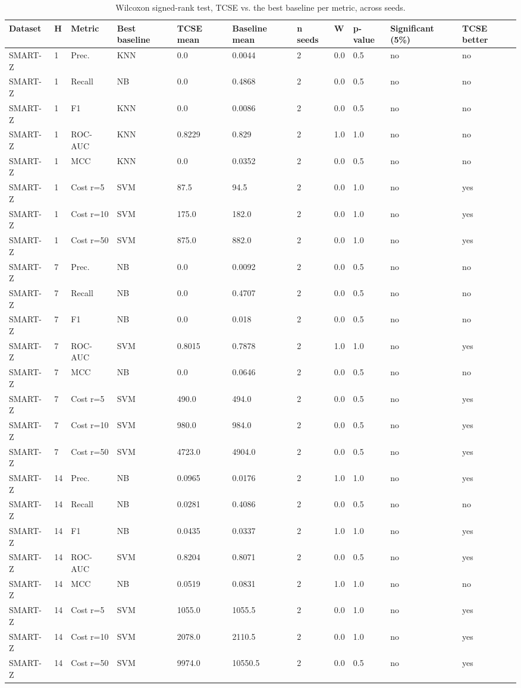 \begin{table}[t]
\centering
\caption{Wilcoxon signed-rank test, TCSE vs. the best baseline per metric, across seeds.}
\label{tab:table2_wilcoxon}
\footnotesize
\begin{tabular}{lllllllllll}
\toprule
Dataset & H & Metric & Best baseline & TCSE mean & Baseline mean & n seeds & W & p-value & Significant (5\%) & TCSE better \\
\midrule
SMART-Z & 1 & Prec. & KNN & 0.0 & 0.0044 & 2 & 0.0 & 0.5 & no & no \\
SMART-Z & 1 & Recall & NB & 0.0 & 0.4868 & 2 & 0.0 & 0.5 & no & no \\
SMART-Z & 1 & F1 & KNN & 0.0 & 0.0086 & 2 & 0.0 & 0.5 & no & no \\
SMART-Z & 1 & ROC-AUC & KNN & 0.8229 & 0.829 & 2 & 1.0 & 1.0 & no & no \\
SMART-Z & 1 & MCC & KNN & 0.0 & 0.0352 & 2 & 0.0 & 0.5 & no & no \\
SMART-Z & 1 & Cost r=5 & SVM & 87.5 & 94.5 & 2 & 0.0 & 1.0 & no & yes \\
SMART-Z & 1 & Cost r=10 & SVM & 175.0 & 182.0 & 2 & 0.0 & 1.0 & no & yes \\
SMART-Z & 1 & Cost r=50 & SVM & 875.0 & 882.0 & 2 & 0.0 & 1.0 & no & yes \\
SMART-Z & 7 & Prec. & NB & 0.0 & 0.0092 & 2 & 0.0 & 0.5 & no & no \\
SMART-Z & 7 & Recall & NB & 0.0 & 0.4707 & 2 & 0.0 & 0.5 & no & no \\
SMART-Z & 7 & F1 & NB & 0.0 & 0.018 & 2 & 0.0 & 0.5 & no & no \\
SMART-Z & 7 & ROC-AUC & SVM & 0.8015 & 0.7878 & 2 & 1.0 & 1.0 & no & yes \\
SMART-Z & 7 & MCC & NB & 0.0 & 0.0646 & 2 & 0.0 & 0.5 & no & no \\
SMART-Z & 7 & Cost r=5 & SVM & 490.0 & 494.0 & 2 & 0.0 & 0.5 & no & yes \\
SMART-Z & 7 & Cost r=10 & SVM & 980.0 & 984.0 & 2 & 0.0 & 0.5 & no & yes \\
SMART-Z & 7 & Cost r=50 & SVM & 4723.0 & 4904.0 & 2 & 0.0 & 0.5 & no & yes \\
SMART-Z & 14 & Prec. & NB & 0.0965 & 0.0176 & 2 & 1.0 & 1.0 & no & yes \\
SMART-Z & 14 & Recall & NB & 0.0281 & 0.4086 & 2 & 0.0 & 0.5 & no & no \\
SMART-Z & 14 & F1 & NB & 0.0435 & 0.0337 & 2 & 1.0 & 1.0 & no & yes \\
SMART-Z & 14 & ROC-AUC & SVM & 0.8204 & 0.8071 & 2 & 0.0 & 0.5 & no & yes \\
SMART-Z & 14 & MCC & NB & 0.0519 & 0.0831 & 2 & 1.0 & 1.0 & no & no \\
SMART-Z & 14 & Cost r=5 & SVM & 1055.0 & 1055.5 & 2 & 0.0 & 1.0 & no & yes \\
SMART-Z & 14 & Cost r=10 & SVM & 2078.0 & 2110.5 & 2 & 0.0 & 1.0 & no & yes \\
SMART-Z & 14 & Cost r=50 & SVM & 9974.0 & 10550.5 & 2 & 0.0 & 0.5 & no & yes \\
\bottomrule
\end{tabular}
\end{table}
